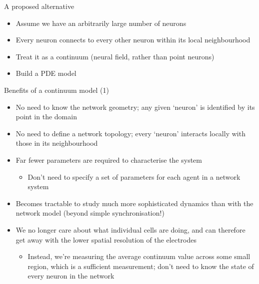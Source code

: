 \documentclass[presentation]{beamer}
\begin{document}
\begin{frame}[label={sec:org1041f69}]{A proposed alternative}
\begin{itemize}
\item Assume we have an arbitrarily large number of neurons
\item Every neuron connects to every other neuron within its local neighbourhood
\item Treat it as a continuum (neural field, rather than point neurons)
\item Build a PDE model
\end{itemize}
\end{frame}

\begin{frame}[label={sec:org494a480}]{Benefits of a continuum model (1)}
\begin{itemize}
\item No need to know the network geometry; any given `neuron' is identified by its point in the domain
\item No need to define a network topology; every `neuron' interacts locally with those in its neighbourhood
\item Far fewer parameters are required to characterise the system
\begin{itemize}
\item Don't need to specify a set of parameters for each agent in a network system
\end{itemize}
\item Becomes tractable to study much more sophisticated dynamics than with the network model (beyond simple synchronisation!)
\item We no longer care about what individual cells are doing, and can therefore get away with the lower spatial resolution of the electrodes
\begin{itemize}
\item Instead, we're measuring the average continuum value across some small region, which is a sufficient measurement; don't need to know the state of every neuron in the network
\end{itemize}
\end{itemize}
\end{frame}
\end{document}
